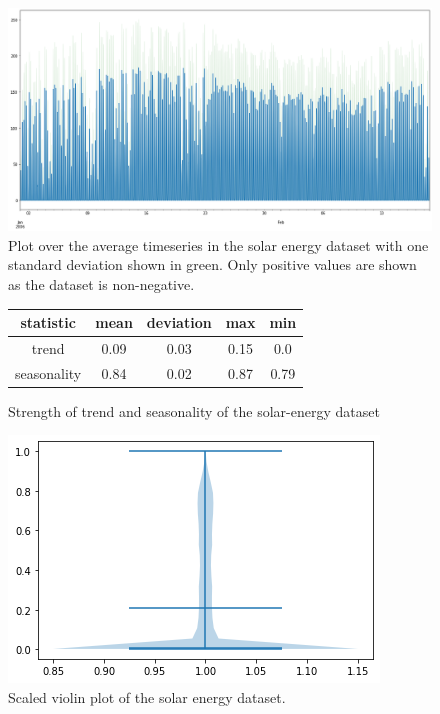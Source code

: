 \begin{figure}[htb]
    \centering
      \includegraphics[width=\linewidth]{4_designing/figures/solar-energy_plot.png}
      \caption{Plot over the average timeseries in the solar energy dataset with one standard deviation shown in green. Only positive values are shown as the dataset is non-negative.}
      \label{fig:solar-energy_plot}
    \endminipage\hfill
\end{figure}

\begin{figure}[htb]
    \centering
        \begin{center}
            \begin{tabular}{||c | c | c | c | c |} 
                \hline
                statistic & mean & deviation & max & min\\
                \hline
                trend & 0.09 & 0.03 & 0.15 & 0.0 \\
                \hline
                seasonality & 0.84 & 0.02 & 0.87 & 0.79 \\
                \hline
                \hline
            \end{tabular}
            \caption{Strength of trend and seasonality of the solar-energy dataset}
        \end{center}
    \endminipage\hfill
      \includegraphics[width=\linewidth]{4_designing/figures/solar-energy_violin.png}
      \caption{Scaled violin plot of the solar energy dataset.}
      \label{fig:solar-energy_violin}
    \endminipage\hfill
\end{figure}

